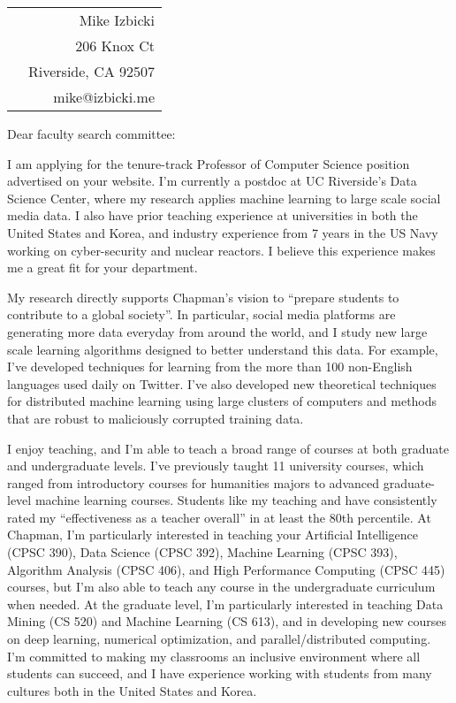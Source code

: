 \documentclass[12pt]{article}
\begin{document}
\noindent
\hspace{-0.13in}
\begin{tabularx}{1.03\textwidth}{Xr}
 & Mike Izbicki \\
 & 206 Knox Ct\\
 & Riverside, CA 92507\\
 & mike@izbicki.me\\
\end{tabularx}

\vspace{0.25in}

\setlength{\parskip}{15pt plus4mm minus3mm}

\vspace{-0.4in}
\noindent
Dear faculty search committee:

\noindent
I am applying for the tenure-track Professor of Computer Science position advertised on your website.
I'm currently a postdoc at UC Riverside's Data Science Center,
where my research applies machine learning to large scale social media data.
I also have prior teaching experience at universities in both the United States and Korea, and
industry experience from 7 years in the US Navy working on cyber-security and nuclear reactors.
I believe this experience makes me a great fit for your department.

\noindent
My research directly supports Chapman's vision to ``prepare students to contribute to a global society''. 
In particular, social media platforms are generating more data everyday from around the world,
and I study new large scale learning algorithms designed to better understand this data.
For example, I've developed techniques for learning from the more than 100 non-English languages used daily on Twitter.
I've also developed new theoretical techniques for distributed machine learning using large clusters of computers and methods that are robust to maliciously corrupted training data.

\noindent
I enjoy teaching,
and I'm able to teach a broad range of courses at both graduate and undergraduate levels.
I've previously taught 11 university courses,
which ranged from introductory courses for humanities majors to advanced graduate-level machine learning courses.
Students like my teaching and have consistently rated my ``effectiveness as a teacher overall'' in at least the 80th percentile.
At Chapman, I'm particularly interested in teaching your Artificial Intelligence (CPSC 390), Data Science (CPSC 392), Machine Learning (CPSC 393), Algorithm Analysis (CPSC 406), and High Performance Computing (CPSC 445) courses,
but I'm also able to teach any course in the undergraduate curriculum when needed.
At the graduate level, I'm particularly interested in teaching Data Mining (CS 520) and Machine Learning (CS 613),
and in developing new courses on deep learning, numerical optimization, and parallel/distributed computing.
I'm committed to making my classrooms an inclusive environment where all students can succeed,
and I have experience working with students from many cultures both in the United States and Korea.
\end{document}
